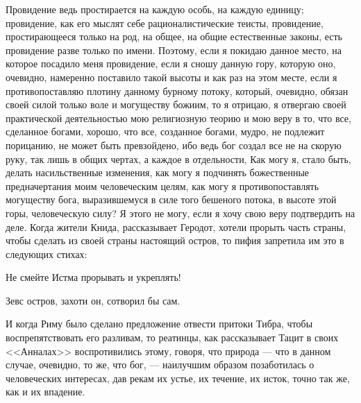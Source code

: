 \documentclass[12pt]{article}
\begin{document}
Провидение ведь простирается на каждую особь, на каждую единицу; провидение, как его мыслят себе рационалистические теисты, провидение, простирающееся только на род, на общее, на общие естественные законы, есть провидение разве только по имени. Поэтому, если я покидаю данное место, на которое посадило меня провидение, если я сношу данную гору, которую оно, очевидно, намеренно поставило такой высоты и как раз на этом месте, если я противопоставляю плотину данному бурному потоку, который, очевидно, обязан своей силой только воле и могуществу божиим, то я отрицаю, я отвергаю своей практической деятельностью мою религиозную теорию и мою веру в то, что все, сделанное богами, хорошо, что все, созданное богами, мудро, не подлежит порицанию, не может быть превзойдено, ибо ведь бог создал все не на скорую руку, так лишь в общих чертах, а каждое в отдельности, Как могу я, стало быть, делать насильственные изменения, как могу я подчинять божественные предначертания моим человеческим целям, как могу я противопоставлять могуществу бога, выразившемуся в силе того бешеного потока, в высоте этой горы, человеческую силу? Я этого не могу, если я хочу свою веру подтвердить на деле. Когда жители Книда, рассказывает Геродот, хотели прорыть часть страны, чтобы сделать из своей страны настоящий остров, то пифия запретила им это в следующих стихах: 

Не смейте Истма прорывать и укреплять! 

Зевс остров, захоти он, сотворил бы сам. 

И когда Риму было сделано предложение отвести притоки Тибра, чтобы воспрепятствовать его разливам, то реатинцы, как рассказывает Тацит в своих <<Анналах>>  воспротивились этому, говоря, что природа --- что в данном случае, очевидно, то же, что бог, --- наилучшим образом позаботилась о человеческих интересах, дав рекам их устье, их течение, их исток, точно так же, как и их впадение. 
\end{document}
